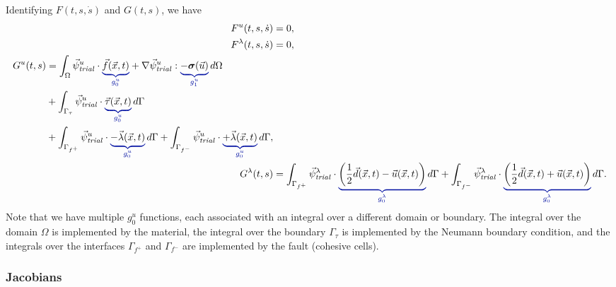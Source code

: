 Identifying $F(t,s,\dot{s})$ and $G(t,s)$, we have
\begin{align}
  F^u(t,s,\dot{s}) &= 0, \\
  F^\lambda(t,s,\dot{s}) &= 0, \\
  \begin{split}
  G^u(t,s) &=  
   \int_\Omega \trialvec[u] \cdot \eqnannotate{\vec{f}(\vec{x},t)}{g_0^u}
  + \nabla \trialvec[u] : \eqnannotate{-\tensor{\sigma}(\vec{u})}{g_1^u} \, d\Omega \\
  &+ \int_{\Gamma_\tau} \trialvec[u] \cdot \eqnannotate{\vec{\tau}(\vec{x},t)}{g_0^u} \, d\Gamma \\
  &+ \int_{\Gamma_{f^+}} \trialvec[u] \cdot \eqnannotate{-\vec{\lambda}(\vec{x},t)}{g_0^u} \, d\Gamma
  + \int_{\Gamma_{f^-}} \trialvec[u] \cdot \eqnannotate{+\vec{\lambda}(\vec{x},t)}{g_0^u} \, d\Gamma,
  \end{split} \\
  G^\lambda(t,s) &= 
\int_{\Gamma_{f^+}} \trialvec[\lambda] \cdot \eqnannotate{\left( \frac{1}{2}\vec{d}(\vec{x},t) - \vec{u}(\vec{x},t) \right)}{g_0^\lambda} \, d\Gamma
    + \int_{\Gamma_{f^-}} \trialvec[\lambda] \cdot \eqnannotate{\left( \frac{1}{2}\vec{d}(\vec{x},t) + \vec{u}(\vec{x},t) \right)}{g_0^\lambda} \, d\Gamma.
\end{align}
Note that we have multiple $g_0^u$ functions, each associated with an
integral over a different domain or boundary. The integral over the
domain $\Omega$ is implemented by the material, the integral over the
boundary $\Gamma_\tau$ is implemented by the Neumann boundary
condition, and the integrals over the interfaces $\Gamma_{f^+}$ and
$\Gamma_{f^-}$ are implemented by the fault (cohesive cells).

\subsubsection{Jacobians}

